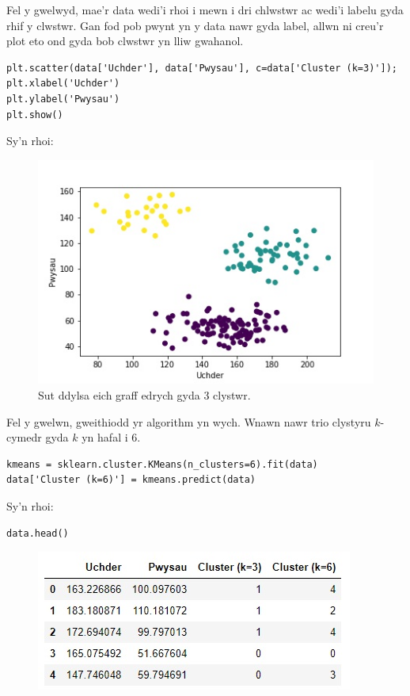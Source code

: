 Fel y gwelwyd, mae'r data wedi'i rhoi i mewn i dri chlwstwr ac wedi'i labelu gyda rhif y clwstwr. Gan fod pob pwynt yn y data nawr gyda label, allwn ni creu'r plot eto ond gyda bob clwstwr yn lliw gwahanol.

\begin{verbatim}
plt.scatter(data['Uchder'], data['Pwysau'], c=data['Cluster (k=3)']);
plt.xlabel('Uchder')
plt.ylabel('Pwysau')
plt.show()
\end{verbatim}

Sy'n rhoi:

\begin{figure}[H]
\begin{center}
\includegraphics[width=0.7\linewidth]{../img/3clystwrpython.jpeg}
\caption{Sut ddylsa eich graff edrych gyda 3 clystwr.}
\label{fig:3clystwrpython}
\end{center}
\end{figure}

Fel y gwelwn, gweithiodd yr algorithm yn wych. Wnawn nawr trio clystyru $k$-cymedr gyda $k$ yn hafal i 6.

\begin{verbatim}
kmeans = sklearn.cluster.KMeans(n_clusters=6).fit(data)
data['Cluster (k=6)'] = kmeans.predict(data)
\end{verbatim}

Sy'n rhoi:

\begin{verbatim}
data.head()
\end{verbatim}

\begin{figure}[H]
\begin{center}
\includegraphics[width=0.35\linewidth]{../img/tabl3.jpg}
\end{center}
\label{fig:Data3}
\end{figure}

